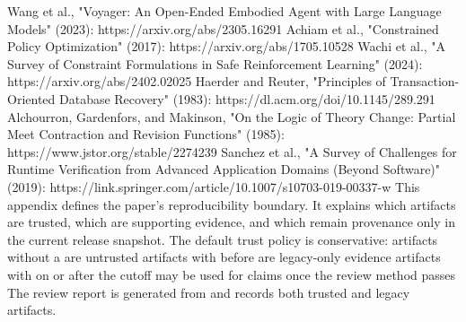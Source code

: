 \markdownRendererUlItem Wang et al., "Voyager: An Open-Ended Embodied Agent with Large Language Models" (2023): https://arxiv.org/abs/2305.16291\markdownRendererUlItemEnd 
\markdownRendererUlItem Achiam et al., "Constrained Policy Optimization" (2017): https://arxiv.org/abs/1705.10528\markdownRendererUlItemEnd 
\markdownRendererUlItem Wachi et al., "A Survey of Constraint Formulations in Safe Reinforcement Learning" (2024): https://arxiv.org/abs/2402.02025\markdownRendererUlItemEnd 
\markdownRendererUlItem Haerder and Reuter, "Principles of Transaction-Oriented Database Recovery" (1983): https://dl.acm.org/doi/10.1145/289.291\markdownRendererUlItemEnd 
\markdownRendererUlItem Alchourron, Gardenfors, and Makinson, "On the Logic of Theory Change: Partial Meet Contraction and Revision Functions" (1985): https://www.jstor.org/stable/2274239\markdownRendererUlItemEnd 
\markdownRendererUlItem Sanchez et al., "A Survey of Challenges for Runtime Verification from Advanced Application Domains (Beyond Software)" (2019): https://link.springer.com/article/10.1007/s10703-019-00337-w\markdownRendererUlItemEnd 
\markdownRendererUlEndTight \markdownRendererInterblockSeparator
{}
\markdownRendererSectionEnd \markdownRendererSectionBegin
{}\markdownRendererInterblockSeparator
{}This appendix defines the paper's reproducibility boundary.\markdownRendererSoftLineBreak
{}It explains which artifacts are trusted, which are supporting evidence, and which remain provenance only in the current release snapshot.\markdownRendererInterblockSeparator
{}\markdownRendererSectionBegin
{}\markdownRendererInterblockSeparator
{}The default trust policy is conservative:\markdownRendererInterblockSeparator
{}\markdownRendererUlBeginTight
\markdownRendererUlItem artifacts without a  are untrusted\markdownRendererUlItemEnd 
\markdownRendererUlItem artifacts with  before  are legacy-only evidence\markdownRendererUlItemEnd 
\markdownRendererUlItem artifacts with  on or after the cutoff may be used for claims once the review method passes\markdownRendererUlItemEnd 
\markdownRendererUlEndTight \markdownRendererInterblockSeparator
{}The review report is generated from  and records both trusted and legacy artifacts.\markdownRendererInterblockSeparator
